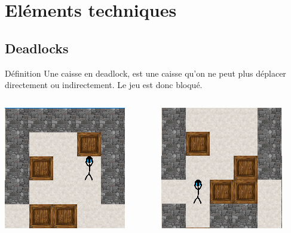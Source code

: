 \documentclass{beamer}
\begin{document}
\section{Eléments techniques}
\subsection{Deadlocks}

\begin{frame}

\begin{block}{Définition}
Une caisse en deadlock, est une caisse qu'on ne peut plus déplacer directement ou indirectement. Le jeu est donc bloqué.
\end{block}
\vspace{0.5cm}
\begin{center}
\begin{columns}
\begin{column}{4cm}
\includegraphics[scale=0.7]{images/deadlock1.PNG}
\end{column}
\begin{column}{4cm}
\includegraphics[scale=0.7]{images/deadlock2.PNG}
\end{column}
\end{columns}
\end{center}
\end{frame}
\end{document}

